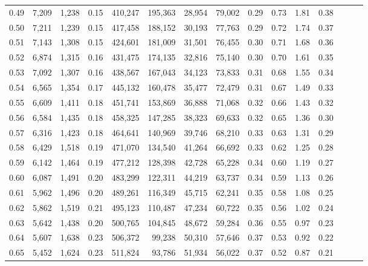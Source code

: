 \begin{tabular}{rrrrrrrrrrrrrrr}
0.49 &  7,209 &  1,238 &  0.15 &  410,247 &  195,363 &   28,954 &   79,002 &  0.29 &  0.73 &  1.81 &      0.38 \\
0.50 &  7,211 &  1,239 &  0.15 &  417,458 &  188,152 &   30,193 &   77,763 &  0.29 &  0.72 &  1.74 &      0.37 \\
0.51 &  7,143 &  1,308 &  0.15 &  424,601 &  181,009 &   31,501 &   76,455 &  0.30 &  0.71 &  1.68 &      0.36 \\
0.52 &  6,874 &  1,315 &  0.16 &  431,475 &  174,135 &   32,816 &   75,140 &  0.30 &  0.70 &  1.61 &      0.35 \\
0.53 &  7,092 &  1,307 &  0.16 &  438,567 &  167,043 &   34,123 &   73,833 &  0.31 &  0.68 &  1.55 &      0.34 \\
0.54 &  6,565 &  1,354 &  0.17 &  445,132 &  160,478 &   35,477 &   72,479 &  0.31 &  0.67 &  1.49 &      0.33 \\
0.55 &  6,609 &  1,411 &  0.18 &  451,741 &  153,869 &   36,888 &   71,068 &  0.32 &  0.66 &  1.43 &      0.32 \\
0.56 &  6,584 &  1,435 &  0.18 &  458,325 &  147,285 &   38,323 &   69,633 &  0.32 &  0.65 &  1.36 &      0.30 \\
0.57 &  6,316 &  1,423 &  0.18 &  464,641 &  140,969 &   39,746 &   68,210 &  0.33 &  0.63 &  1.31 &      0.29 \\
0.58 &  6,429 &  1,518 &  0.19 &  471,070 &  134,540 &   41,264 &   66,692 &  0.33 &  0.62 &  1.25 &      0.28 \\
0.59 &  6,142 &  1,464 &  0.19 &  477,212 &  128,398 &   42,728 &   65,228 &  0.34 &  0.60 &  1.19 &      0.27 \\
0.60 &  6,087 &  1,491 &  0.20 &  483,299 &  122,311 &   44,219 &   63,737 &  0.34 &  0.59 &  1.13 &      0.26 \\
0.61 &  5,962 &  1,496 &  0.20 &  489,261 &  116,349 &   45,715 &   62,241 &  0.35 &  0.58 &  1.08 &      0.25 \\
0.62 &  5,862 &  1,519 &  0.21 &  495,123 &  110,487 &   47,234 &   60,722 &  0.35 &  0.56 &  1.02 &      0.24 \\
0.63 &  5,642 &  1,438 &  0.20 &  500,765 &  104,845 &   48,672 &   59,284 &  0.36 &  0.55 &  0.97 &      0.23 \\
0.64 &  5,607 &  1,638 &  0.23 &  506,372 &   99,238 &   50,310 &   57,646 &  0.37 &  0.53 &  0.92 &      0.22 \\
0.65 &  5,452 &  1,624 &  0.23 &  511,824 &   93,786 &   51,934 &   56,022 &  0.37 &  0.52 &  0.87 &      0.21 \\

\end{tabular}
